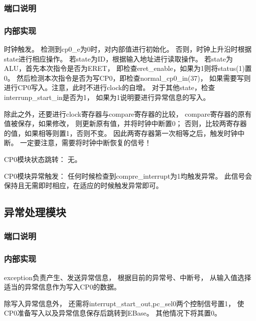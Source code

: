         \subsubsection{端口说明}
            
        \subsubsection{内部实现}
            时钟触发。%
            检测到cp0\_e为0时，对内部值进行初始化。%
            否则，时钟上升沿时根据state进行相应操作。%
            若state为ID，根据输入地址进行读取操作。%
            若state为ALU，首先本次指令是否为ERET，%
            即检查eret\_enable，如果为1则将status(1)置0。%
            然后检测本次指令是否为写CP0，即检查normal\_cp0\_in(37)，%
            如果需要写则进行CP0写入。注意，此时不进行clock的自增。%
            对于其他state，检查interrunp\_start\_in是否为1，%
            如果为1说明要进行异常信息的写入。%
            
            除此之外，还要进行clock寄存器与compare寄存器的比较，%
            compare寄存器的原有值被保存，如果修改，%
            则更新原有值，并将时钟中断置0；%
            否则，比较两寄存器的值，如果相等则置1，否则不变。%
            因此两寄存器第一次相等之后，触发时钟中断。%
            一定要注意，需要将时钟中断恢复的信号！

            CP0模块状态跳转：%
            无。%

            CP0模块异常触发：%
            任何时候检查到compre\_interrupt为1均触发异常。%
            此信号会保持且无需即时相应，在适应的时候触发异常即可。
    
    \subsection{异常处理模块}
        \subsubsection{端口说明}
            
        \subsubsection{内部实现}

	        exception负责产生、发送异常信息，%
            根据目前的异常号、中断号，%
            从输入值选择适当的异常信息作为写入CP0的数据。%
	        
            除写入异常信息外，%
            还需将interrupt\_start\_out,pc\_sel0两个控制信号置1，%
            使CP0准备写入以及异常信息保存后跳转到EBase。%
            其他情况下将其置0。

